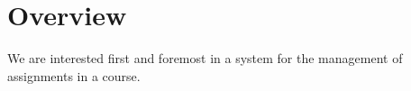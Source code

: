 
\section{Overview}

We are interested first and foremost in a system for the management of
assignments in a course.
